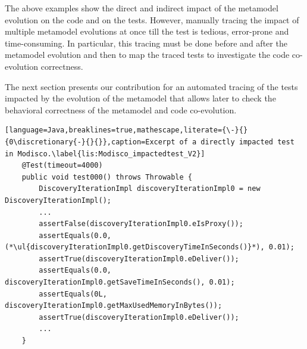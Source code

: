 {	The above examples show the direct and indirect impact of the metamodel evolution on the code and on the tests. However, manually tracing the impact of multiple metamodel evolutions at once till the test is tedious, error-prone and time-consuming. In particular, this tracing must be done before and after the metamodel evolution and then to map the traced tests to investigate the code co-evolution correctness. 
	
	The next section presents our contribution for an automated tracing of the tests impacted by the evolution of the metamodel that allows later to check the behavioral correctness of the metamodel and code co-evolution. 
	
}


	




\begin{lstlisting}[language=Java,breaklines=true,mathescape,literate={\-}{}{0\discretionary{-}{}{}},caption=Excerpt of a directly impacted test in Modisco.\label{lis:Modisco_impactedtest_V2}]
	@Test(timeout=4000)
	public void test000() throws Throwable {
		DiscoveryIterationImpl discoveryIterationImpl0 = new DiscoveryIterationImpl();
		...
		assertFalse(discoveryIterationImpl0.eIsProxy());
		assertEquals(0.0,  (*\ul{discoveryIterationImpl0.getDiscoveryTimeInSeconds()}*), 0.01);
		assertTrue(discoveryIterationImpl0.eDeliver());
		assertEquals(0.0, discoveryIterationImpl0.getSaveTimeInSeconds(), 0.01);
		assertEquals(0L, discoveryIterationImpl0.getMaxUsedMemoryInBytes());
		assertTrue(discoveryIterationImpl0.eDeliver());
		...
	}
	
	
\end{lstlisting}

